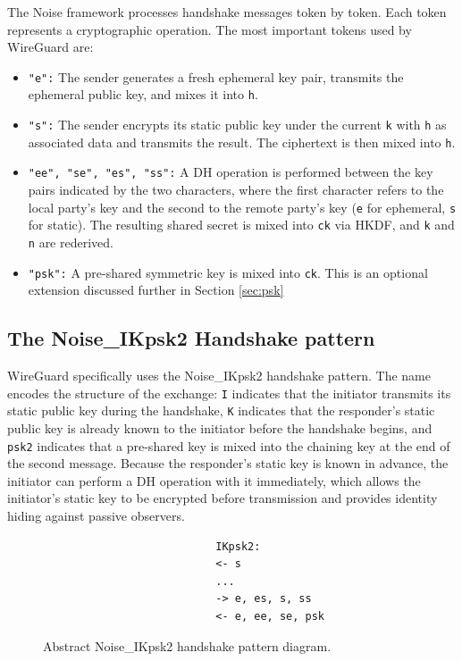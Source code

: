 The Noise framework processes handshake messages token by token. Each token represents a cryptographic operation. The most important tokens used by WireGuard are:
\begin{itemize}
    \item \texttt{"e":} The sender generates a fresh ephemeral key pair, transmits the ephemeral public key, and mixes it into \texttt{h}.
    \item \texttt{"s":} The sender encrypts its static public key under the current \texttt{k} with \texttt{h} as associated data and transmits the result. The ciphertext is then mixed into \texttt{h}.
    \item \texttt{"ee", "se", "es", "ss":} A DH operation is performed between the key pairs indicated by the two characters, where the first character refers to the local party's key and the second to the remote party's key (\texttt{e} for ephemeral, \texttt{s} for static). The resulting shared secret is mixed into \texttt{ck} via HKDF, and \texttt{k} and \texttt{n} are rederived.
    \item \texttt{"psk":} A pre-shared symmetric key is mixed into \texttt{ck}. This is an optional extension discussed further in Section \ref{sec:psk}
\end{itemize}

\subsection{The Noise\_IKpsk2 Handshake pattern}\label{sec:noise-ik}
WireGuard specifically uses the Noise\_IKpsk2 handshake pattern. The name encodes the structure of the exchange: \texttt{I} indicates that the initiator transmits its static public key during the handshake, \texttt{K} indicates that the responder's static public key is already known to the initiator before the handshake begins, and \texttt{psk2} indicates that a pre-shared key is mixed into the chaining key at the end of the second message. Because the responder's static key is known in advance, the initiator can perform a DH operation with it immediately, which allows the initiator's static key to be encrypted before transmission and provides identity hiding against passive observers.

\begin{figure}[h]
\centering
\begin{verbatim}
                           IKpsk2:
                           <- s
                           ...
                           -> e, es, s, ss
                           <- e, ee, se, psk
\end{verbatim}
\caption{Abstract Noise\_IKpsk2 handshake pattern diagram.}
\label{fig:IKpsk2}
\end{figure}

